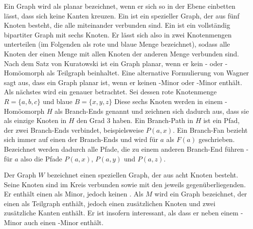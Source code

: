 Ein Graph wird als planar bezeichnet, wenn er sich so in der Ebene einbetten lässt, dass sich keine Kanten kreuzen.
Ein \kf ist ein spezieller Graph, der aus fünf Knoten besteht, die alle miteinander verbunden sind. %
Ein \kdd ist ein vollständig bipartiter Graph mit sechs Knoten.
Er lässt sich also in zwei Knotenmengen unterteilen (im Folgenden als rote und blaue Menge bezeichnet), sodass alle Knoten der einen Menge mit allen Knoten der anderen Menge verbunden sind. %
Nach dem Satz von Kuratowski ist ein Graph planar, wenn er kein \kf- oder \kdd-Homöomorph als Teilgraph beinhaltet.
Eine alternative Formulierung von Wagner sagt aus, dass ein Graph planar ist, wenn er keinen \kf-Minor oder \kdd-Minor enthält.\cite{Die12}
Als nächstes wird ein \kdd genauer betrachtet.
Sei dessen rote Knotenmenge $R = \{a, b, c\}$ und blaue $B = \{x, y, z\}$
Diese sechs Knoten werden in einem \kdd-Homöomorph $H$ als Branch-Ends genannt und zeichnen sich dadurch aus, dass sie als einzige Knoten in $H$ den Grad 3 haben.
Ein Branch-Path in $H$ ist ein Pfad, der zwei Branch-Ends verbindet, beispielsweise $P(a, x)$.
Ein Branch-Fan bezieht sich immer auf einen der Branch-Ends und wird \zB für $a$ als $F(a)$ geschrieben.
Bezeichnet werden dadurch alle Pfade, die zu einem anderen Branch-End führen - für $a$ also die Pfade $P(a, x)$, $P(a, y)$ und $P(a, z)$.

Der Graph $W$ bezeichnet einen speziellen Graph, der aus acht Knoten besteht.
Seine Knoten sind im Kreis verbunden sowie mit den jeweils gegenüberliegenden.
Er enthält einen \kdd als Minor, jedoch keinen \kf.%
Als $M$ wird ein Graph bezeichnet, der einen \kdd als Teilgraph enthält, jedoch einen zusätzlichen Knoten und zwei zusätzliche Kanten enthält.
Er ist insofern interessant, als dass er neben einem \kdd-Minor auch einen \kf-Minor enthält. %

